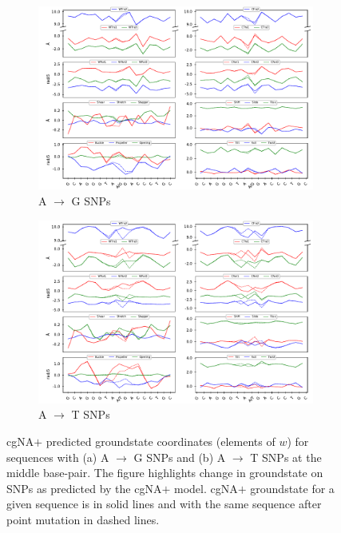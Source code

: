 \begin{figure}[p]
  \begin{subfigure}{15cm}
    \centering\includegraphics[scale=1]{images/compare_gs_SNiPs_min.pdf}
    \centering\caption{A $\longrightarrow$ G SNPs}
  \end{subfigure} 
  \begin{subfigure}{15cm}
    \centering\includegraphics[scale=1]{images/compare_gs_SNiPs_max.pdf} 
    \centering\caption{A $\longrightarrow$ T SNPs}

  \end{subfigure}
\centering\caption{cgNA$+$ predicted groundstate coordinates (elements of $w$) for sequences with (a) A $\longrightarrow$ G SNPs and (b) A $\longrightarrow$ T SNPs at the middle base-pair. 
The figure highlights change in groundstate on SNPs as predicted by the cgNA$+$ model.
cgNA$+$ groundstate for a given sequence is in solid lines and with the same sequence after point mutation in dashed lines.}
\label{c4:fig_comp_SNPs}
\end{figure}

